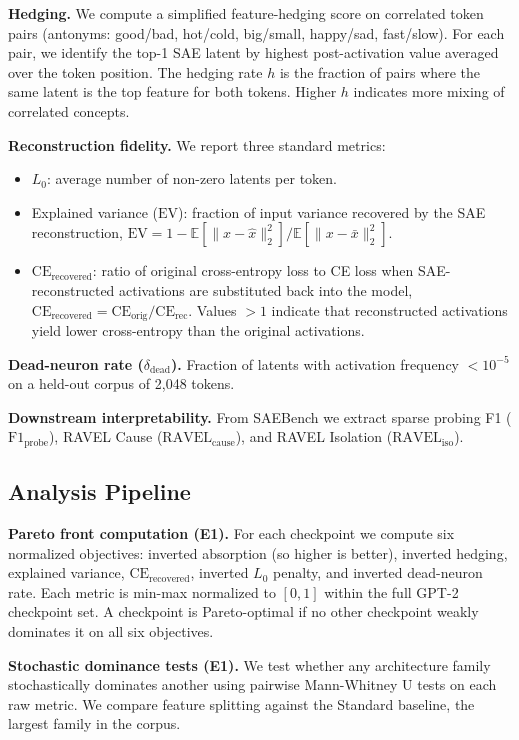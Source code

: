 \documentclass{article}
\begin{document}
\textbf{Hedging.} We compute a simplified feature-hedging score on correlated token pairs (antonyms: good/bad, hot/cold, big/small, happy/sad, fast/slow). For each pair, we identify the top-1 SAE latent by highest post-activation value averaged over the token position. The hedging rate $h$ is the fraction of pairs where the same latent is the top feature for both tokens. Higher $h$ indicates more mixing of correlated concepts.

\textbf{Reconstruction fidelity.} We report three standard metrics:
\begin{itemize}
    \item $L_0$: average number of non-zero latents per token.
    \item Explained variance ($\text{EV}$): fraction of input variance recovered by the SAE reconstruction, $\text{EV} = 1 - \mathbb{E}[\|x - \hat{x}\|_2^2] / \mathbb{E}[\|x - \bar{x}\|_2^2]$.
    \item $\text{CE}_{\text{recovered}}$: ratio of original cross-entropy loss to CE loss when SAE-reconstructed activations are substituted back into the model, $\text{CE}_{\text{recovered}} = \text{CE}_{\text{orig}} / \text{CE}_{\text{rec}}$. Values $>1$ indicate that reconstructed activations yield lower cross-entropy than the original activations.
\end{itemize}

\textbf{Dead-neuron rate ($\delta_{\text{dead}}$).} Fraction of latents with activation frequency $< 10^{-5}$ on a held-out corpus of 2,048 tokens.

\textbf{Downstream interpretability.} From SAEBench we extract sparse probing F1 ($\text{F1}_{\text{probe}}$), RAVEL Cause ($\text{RAVEL}_{\text{cause}}$), and RAVEL Isolation ($\text{RAVEL}_{\text{iso}}$).

\subsection{Analysis Pipeline}

\textbf{Pareto front computation (E1).} For each checkpoint we compute six normalized objectives: inverted absorption (so higher is better), inverted hedging, explained variance, $\text{CE}_{\text{recovered}}$, inverted $L_0$ penalty, and inverted dead-neuron rate. Each metric is min-max normalized to $[0, 1]$ within the full GPT-2 checkpoint set. A checkpoint is Pareto-optimal if no other checkpoint weakly dominates it on all six objectives.

\textbf{Stochastic dominance tests (E1).} We test whether any architecture family stochastically dominates another using pairwise Mann-Whitney U tests on each raw metric. We compare feature splitting against the Standard baseline, the largest family in the corpus.
\end{document}
